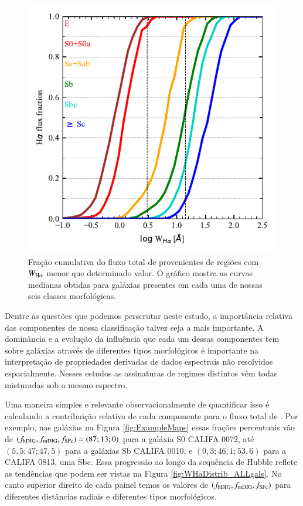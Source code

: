 \begin{figure}
 \includegraphics[scale=1.3]{figuras/fig_cumul_fHaWHa_per_morftype.pdf}
 \caption[Fração cumulativa do fluxo de ${\rm H}\alpha$ com o crescimento de $W_{{\rm H}\alpha}$ para diferentes classes morfológicas]
 {Fração cumulativa do fluxo total de \Ha provenientes de regiões com $W_{\Ha}$ menor que determinado valor. O gráfico mostra as curvas medianas obtidas para galáxias presentes em cada uma de nossas seis classes morfológicas.}
 \label{fig:CurveOfGrowth}
\end{figure}

Dentre as questões que podemos perscrutar neste estudo, a importância relativa das componentes de nossa classificação talvez seja a mais importante. A dominância e a evolução da influência que cada um dessas componentes tem sobre galáxias através de diferentes tipos morfológicos é importante na interpretação de propriedades derivadas de dados espectrais não resolvidos espacialmente. Nesses estudos as assinaturas de regimes distintos vêm todas misturadas sob o mesmo espectro.

Uma maneira simples e relevante observacionalmente de quantificar isso é calculando a contribuição relativa de cada componente para o fluxo total de \Ha. Por exemplo, nas galáxias na Figura \ref{fig:ExampleMaps} essas frações percentuais vão de $(f_{\rm hDIG} , f_{\rm mDIG} , f_{\rm SFc}) = (87;13;0)$ para a galáxia S0 CALIFA 0072, até $(5,5;47;47,5)$ para a galáxias Sb CALIFA 0010, e $(0,3;46,1;53,6)$ para a CALIFA 0813, uma Sbc. Essa progressão ao longo da sequência de Hubble reflete as tendências que podem ser vistas na Figura \ref{fig:WHaDistrib_ALLgals}. No canto superior direito de cada painel temos os valores de $(f_{\rm hDIG} , f_{\rm mDIG} , f_{\rm SFc})$ para diferentes distâncias radiais e diferentes tipos morfológicos.

